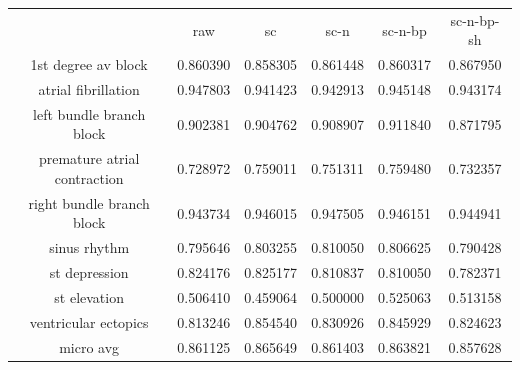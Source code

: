\documentclass{article}
\begin{document}
\begin{table}[tpb]
\centering
\begin{tabular}{|cccccc|}
\hline

 &  raw &  sc &  sc-n &  sc-n-bp &  sc-n-bp-sh \\

1st degree av block          &                      0.860390 &                     0.858305 &                       0.861448 &                          0.860317 &                             0.867950 \\
atrial fibrillation          &                      0.947803 &                     0.941423 &                       0.942913 &                          0.945148 &                             0.943174 \\
left bundle branch block     &                      0.902381 &                     0.904762 &                       0.908907 &                          0.911840 &                             0.871795 \\
premature atrial contraction &                      0.728972 &                     0.759011 &                       0.751311 &                          0.759480 &                             0.732357 \\
right bundle branch block    &                      0.943734 &                     0.946015 &                       0.947505 &                          0.946151 &                             0.944941 \\
sinus rhythm                 &                      0.795646 &                     0.803255 &                       0.810050 &                          0.806625 &                             0.790428 \\
st depression                &                      0.824176 &                     0.825177 &                       0.810837 &                          0.810050 &                             0.782371 \\
st elevation                 &                      0.506410 &                     0.459064 &                       0.500000 &                          0.525063 &                             0.513158 \\
ventricular ectopics         &                      0.813246 &                     0.854540 &                       0.830926 &                          0.845929 &                             0.824623 \\
micro avg                    &                      0.861125 &                     0.865649 &                       0.861403 &                          0.863821 &                             0.857628 \\

\end{tabular}
\end{table}
\end{document}
